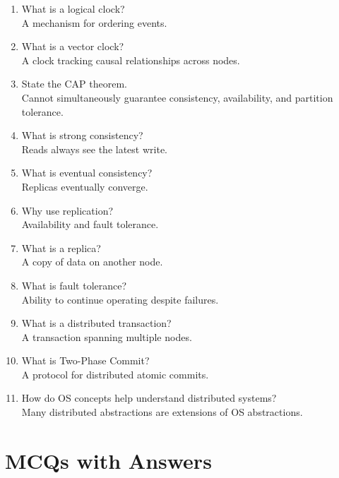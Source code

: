 \begin{enumerate}
\item What is a logical clock?\\
A mechanism for ordering events.

\item What is a vector clock?\\
A clock tracking causal relationships across nodes.

\item State the CAP theorem.\\
Cannot simultaneously guarantee consistency, availability, and partition tolerance.

\item What is strong consistency?\\
Reads always see the latest write.

\item What is eventual consistency?\\
Replicas eventually converge.

\item Why use replication?\\
Availability and fault tolerance.

\item What is a replica?\\
A copy of data on another node.

\item What is fault tolerance?\\
Ability to continue operating despite failures.

\item What is a distributed transaction?\\
A transaction spanning multiple nodes.

\item What is Two-Phase Commit?\\
A protocol for distributed atomic commits.

\item How do OS concepts help understand distributed systems?\\
Many distributed abstractions are extensions of OS abstractions.
\end{enumerate}

\section{MCQs with Answers}

